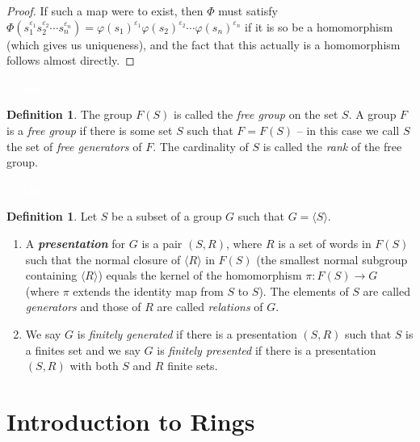 \documentclass{article}
\theoremstyle{definition}
\newtheorem{defn}[thm]{Definition}
\newcommand{\nl}{\textcolor{white}{nothing}}
\newcommand{\ra}{\rightarrow}
\newcommand{\vphi}{\varphi}
\begin{document}
\begin{proof}
If such a map were to exist, then $\Phi$ must satisfy $\Phi(s_1^{\varepsilon_1}s_2^{\varepsilon_2}\cdots s_n^{\varepsilon_n}) = \vphi(s_1)^{\varepsilon_1}\vphi(s_2)^{\varepsilon_2}\cdots \vphi(s_n)^{\varepsilon_n}$ if it is so be a homomorphism (which gives us uniqueness), and the fact that this actually is a homomorphism follows almost directly.
\end{proof}

\nl

\begin{defn}
The group $F(S)$ is called the \textit{free group} on the set $S$. A group $F$ is a \textit{free group} if there is some set $S$ such that $F= F(S)$ -- in this case we call $S$ the set of \textit{free generators} of $F$. The cardinality of $S$ is called the \textit{rank} of the free group.
\end{defn}

\nl

\begin{defn}
Let $S$ be a subset of a group $G$ such that $G = \langle S\rangle$.
\begin{enumerate}
\item A \textit{\textbf{presentation}} for $G$ is a pair $(S,R)$, where $R$ is a set of words in $F(S)$ such that the normal closure of $\langle R\rangle$ in $F(S)$ (the smallest normal subgroup containing $\langle R\rangle$) equals the kernel of the homomorphism $\pi:F(S)\ra G$ (where $\pi$ extends the identity map from $S$ to $S$). The elements of $S$ are called \textit{generators} and those of $R$ are called \textit{relations} of $G$.
\item We say $G$ is \textit{finitely generated} if there is a presentation $(S,R)$ such that $S$ is a finites set and we say $G$ is \textit{finitely presented} if there is a presentation $(S,R)$ with both $S$ and $R$ finite sets.
\end{enumerate}
\end{defn}



\section{Introduction to Rings}

\setcounter{thm}{0}
\end{document}
